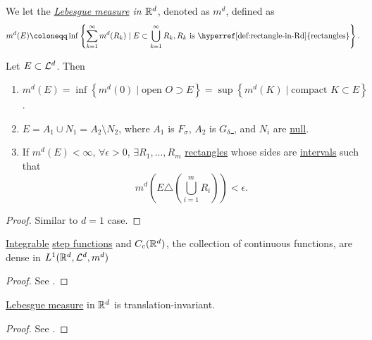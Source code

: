 \begin{definition}
	We let the \emph{\hyperref[def:Lebesgue-measure]{Lebesgue measure} in \(\mathbb{\MakeUppercase{r}} ^d\)}, denoted as \(m^d\), defined as
	\[
		m^d(E) \coloneqq \inf \left\{\sum\limits_{k=1}^{\infty} m^d(R_{k} )\mid E\subset \bigcup\limits_{k=1}^{\infty} R_{k} , R_{k} \text{ is \hyperref[def:rectangle-in-Rd]{rectangles}}\right\}.
	\]
\end{definition}
\begin{theorem}\label{thm:lec-20}
	Let \(E\subset \mathcal{\MakeUppercase{l}} ^d\). Then
	\begin{enumerate}[(1)]
		\item \(m^d(E) = \inf \left\{m^d (0) \mid \text{open } O\supset E \right\} = \sup \left\{m^d (K)\mid \text{compact }K\subset E \right\}\).
		\item \(E = A_1 \cup N_1 = A_2 \setminus N_2\), where \(A_1\) is \hyperref[def:F-sigma-set]{\(F_\sigma \)}, \(A_2\) is \hyperref[def:G-delta-set]{\(G_\delta \) }, and \(N_{i} \) are \hyperref[def:mu-null-set]{null}.
		\item If \(m^d(E)<\infty \), \(\forall \epsilon >0\), \(\exists R_1, \ldots , R_m \) \hyperref[def:rectangle-in-Rd]{rectangles} whose sides are \underline{intervals} such that
		      \[
			      m^d \left(E\triangle \left(\bigcup\limits_{i=1}^{m} R_{i} \right)\right)< \epsilon .
		      \]
	\end{enumerate}
\end{theorem}
\begin{proof}
	Similar to \(d = 1\) case.
\end{proof}

\begin{theorem}
	\hyperref[def:integrable]{Integrable} \hyperref[def:step-function]{step functions} and \(C_c(\mathbb{\MakeUppercase{r}} ^d)\), the collection
	of continuous functions, are dense in \(L^1(\mathbb{\MakeUppercase{r}} ^d, \mathcal{\MakeUppercase{l}} ^d, m^d)\)
\end{theorem}
\begin{proof}
	See \cite{folland1999real}.
\end{proof}

\begin{theorem}
	\hyperref[def:Lebesgue-measure]{Lebesgue measure} in \(\mathbb{\MakeUppercase{r}} ^d\) is translation-invariant.
\end{theorem}
\begin{proof}
	See \cite{folland1999real}.
\end{proof}

